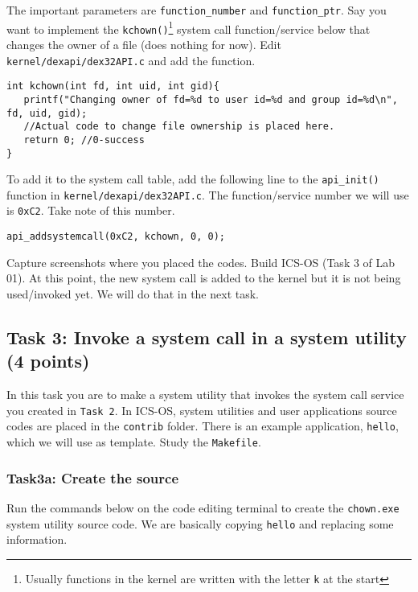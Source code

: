 \documentclass[a4paper, 11pt,oneside]{article}
\begin{document}
The important parameters are \texttt{function\_number} and 
\texttt{function\_ptr}. Say you want to implement the 
\texttt{kchown()}\footnote{Usually functions in the kernel are written with the 
letter \texttt{k} at the start} system call function/service below that changes 
the owner of a file (does nothing for now). Edit  
\texttt{kernel/dexapi/dex32API.c} and add the function.

\begin{verbatim}
int kchown(int fd, int uid, int gid){
   printf("Changing owner of fd=%d to user id=%d and group id=%d\n", fd, uid, gid);
   //Actual code to change file ownership is placed here.   
   return 0; //0-success
}
\end{verbatim}

To add it to the system call table, add the following line to the 
\texttt{api\_init()} function in \newline 
\texttt{kernel/dexapi/dex32API.c}. The function/service number we will use is 
\texttt{0xC2}. Take note of this number.

\begin{verbatim}
api_addsystemcall(0xC2, kchown, 0, 0);
\end{verbatim}

Capture screenshots where you placed the codes. 
Build ICS-OS (Task 3 of Lab 01). At this point, the new system call is added to 
the kernel but it 
is not being used/invoked yet. We will do that in the next task. 

\subsection*{Task 3: Invoke a system call in a system utility (4 points)}
In this task you are to make a system utility that invokes the system call 
service you created in \texttt{Task 2}. In ICS-OS, system utilities  and user 
applications source codes are placed in the \texttt{contrib} folder. There is 
an example application, \texttt{hello}, which we will use as template. Study 
the \texttt{Makefile}. 

\subsubsection*{Task3a: Create the source}
Run the commands below on the code editing terminal to create the  
\texttt{chown.exe} system utility source code. We are basically copying 
\texttt{hello} and replacing some information.
\end{document}
